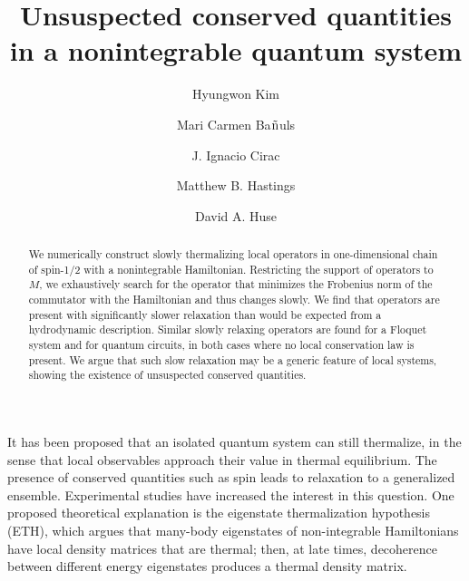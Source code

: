 \documentclass[twocolumn,superscriptaddress, prb]{revtex4-1}
\begin{document}
\title{Unsuspected conserved quantities in a nonintegrable quantum system}

\author{Hyungwon Kim}

\author{Mari Carmen Ba${\rm{\tilde n}}$uls}

\author{J. Ignacio Cirac}

\author{Matthew B. Hastings}

\author{David A. Huse}

\begin{abstract}
We numerically construct slowly thermalizing local operators in one-dimensional chain of spin-1/2 with a nonintegrable Hamiltonian.
Restricting the support of operators to $M$, we exhaustively search for the operator that minimizes the Frobenius norm of the commutator
with the Hamiltonian and thus changes slowly.  We find that operators are present with significantly slower relaxation than would be
expected from a hydrodynamic description.  Similar slowly relaxing operators are found for a Floquet system and for quantum circuits, in both cases where no local conservation law is present.  We argue that such slow relaxation may be a generic feature of local systems, showing the existence of unsuspected conserved quantities.
\end{abstract}

\pacs{}

\maketitle

It has been proposed that an isolated quantum system can still thermalize, in the sense that local observables approach their value in thermal  equilibrium\cite{Deutsch:1991,Srednicki:1994,Rigol:2008}.  The presence of conserved quantities such as spin leads to relaxation to a generalized ensemble.  Experimental studies have increased the interest in this question\cite{Polkovnikov:2011, Yukalov:2011}.  One proposed theoretical explanation is the eigenstate thermalization hypothesis (ETH)\cite{Deutsch:1991,Srednicki:1994,Rigol:2008,Santos:2010,Rigol:2012,Kruczenski:2013,Beugeling:2014,Sorg:2014,Kim_ETH,Goldstein:2014}, which argues that many-body eigenstates of non-integrable Hamiltonians have local density matrices that are thermal; then, at late times, decoherence between different energy eigenstates produces a thermal density matrix.
\end{document}
